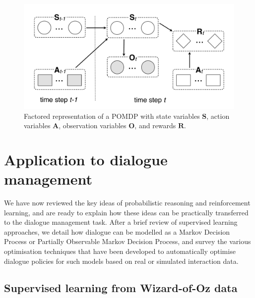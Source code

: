 \begin{figure}[h]
\centering
\includegraphics[scale=0.25]{imgs/pomdp3.pdf}
\caption{Factored representation of a POMDP with state variables $\mathbf{S}$, action variables $\mathbf{A}$, observation variables $\mathbf{O}$, and rewards $\mathbf{R}$. }
\label{fig:pomdp3}
\end{figure}

\section{Application to dialogue management}
\label{sec:application-dm}

We have now reviewed the key ideas of probabilistic reasoning and reinforcement learning, and are ready to explain how these ideas can be practically transferred to the dialogue management task.  After a brief review of supervised learning approaches, we detail how dialogue can be modelled as a Markov Decision Process or Partially Observable Markov Decision Process, and survey the various optimisation techniques that have been developed to automatically optimise dialogue policies for such models based on real or simulated interaction data.  

\subsection{Supervised learning from Wizard-of-Oz data}


